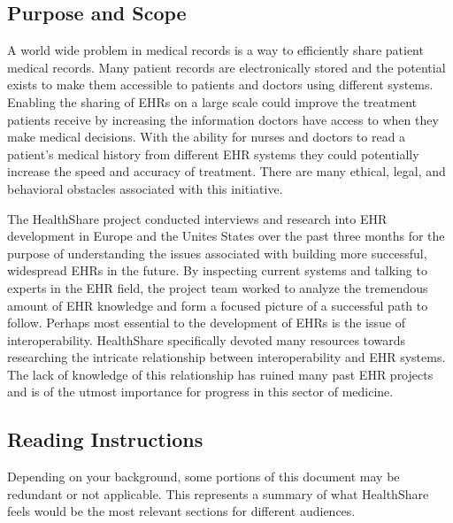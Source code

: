 \documentclass[14pt]{article}
\begin{document}



\subsection{Purpose and Scope}
A world wide problem in medical records is a way to efficiently share patient medical records. Many patient records are electronically stored and the potential exists to make them accessible to patients and doctors using different systems. Enabling the sharing of \glspl{EHR} on a large scale could improve the treatment patients receive by increasing the information doctors have access to when they make medical decisions. With the ability for nurses and doctors to read a patient's medical history from different \gls{EHR} systems they could potentially increase the speed and accuracy of treatment. There are many ethical, legal, and behavioral obstacles associated with this initiative.

The HealthShare project conducted interviews and research into \gls{EHR} development in Europe and the Unites States over the past three months for the purpose of understanding the issues associated with building more successful, widespread \glspl{EHR} in the future. By inspecting current systems and talking to experts in the \gls{EHR} field, the project team worked to analyze the tremendous amount of \gls{EHR} knowledge and form a focused picture of a successful path to follow. Perhaps most essential to the development of \glspl{EHR} is the issue of interoperability. HealthShare specifically devoted many resources towards researching the intricate relationship between interoperability and \gls{EHR} systems. The lack of knowledge of this relationship has ruined many past \gls{EHR} projects and is of the utmost importance for progress in this sector of medicine.



\subsection{Reading Instructions}
Depending on your background, some portions of this document may be redundant or not applicable. This represents a summary of what HealthShare feels would be the most relevant sections for different audiences.
\end{document}
